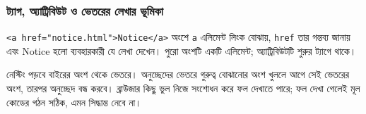 \subsubsection{ট্যাগ, অ্যাট্রিবিউট ও ভেতরের লেখার ভূমিকা}
\texttt{<a href="notice.html">Notice</a>} অংশে \texttt{a} এলিমেন্ট লিংক বোঝায়, \texttt{href} তার গন্তব্য জানায় এবং Notice হলো ব্যবহারকারী যে লেখা দেখেন। পুরো অংশটি একটি এলিমেন্ট; অ্যাট্রিবিউটটি শুরুর ট্যাগে থাকে।

নেস্টিং পড়বে বাইরের অংশ থেকে ভেতরে। অনুচ্ছেদের ভেতরে গুরুত্ব বোঝানোর অংশ খুললে আগে সেই ভেতরের অংশ, তারপর অনুচ্ছেদ বন্ধ করবে। ব্রাউজার কিছু ভুল নিজে সংশোধন করে ফল দেখাতে পারে; ফল দেখা গেলেই মূল কোডের গঠন সঠিক, এমন সিদ্ধান্ত নেবে না।
